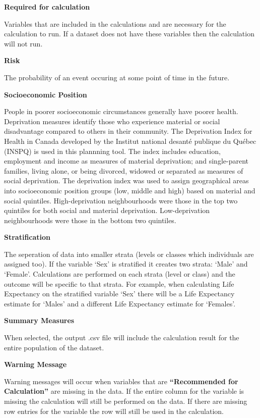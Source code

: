 \documentclass[]{book}
\begin{document}
\textbf{Required for calculation}

Variables that are included in the calculations and are necessary for
the calculation to run. If a dataset does not have these variables then
the calculation will not run.

\textbf{Risk}

The probability of an event occuring at some point of time in the
future.

\textbf{Socioeconomic Position}

People in poorer socioeconomic circumstances generally have poorer
health. Deprivation measures identify those who experience material or
social disadvantage compared to others in their community. The
Deprivation Index for Health in Canada developed by the Institut
national desanté publique du Québec (INSPQ)\citep{INSPQ2000} is used in
this plannning tool. The index includes education, employment and income
as measures of material deprivation; and single-parent families, living
alone, or being divorced, widowed or separated as measures of social
deprivation. The deprivation index was used to assign geographical areas
into socioeconomic position groups (low, middle and high) based on
material and social quintiles. High-deprivation neighbourhoods were
those in the top two quintiles for both social and material deprivation.
Low-deprivation neighbourhoods were those in the bottom two quintiles.

\textbf{Stratification}

The seperation of data into smaller strata (levels or
classes which individuals are assigned too). If the variable `Sex' is
stratified it creates two strata: `Male' and `Female'. Calculations are
performed on each strata (level or class) and the outcome will be
specific to that strata. For example, when calculating Life Expectancy
on the stratified variable `Sex' there will be a Life Expectancy
estimate for `Males' and a different Life Expectancy estimate for
`Females'.

\textbf{Summary Measures}

When selected, the output .csv file will include the calculation result
for the entire population of the dataset.

\textbf{Warning Message}

Warning messages will occur when variables that are
\textbf{``Recommended for Calculation''} are missing in the data. If the
entire column for the variable is missing the calculation will still be
performed on the data. If there are missing row entries for the variable
the row will still be used in the calculation.
\end{document}
